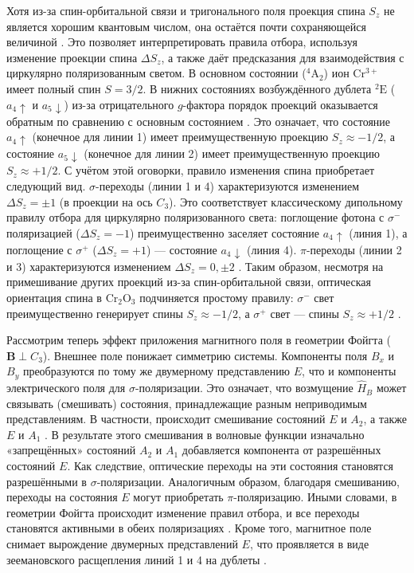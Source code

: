 \documentclass[14pt]{extarticle}
\newcommand{\crome}{\mathrm{Cr}_{2}\mathrm{O}_{3}}
\numberwithin{equation}{section}
\begin{document}
Хотя из-за спин-орбитальной связи и тригонального поля проекция спина $S_z$ не является хорошим квантовым числом, она остаётся почти сохраняющейся величиной \cite{Allen1969}. Это позволяет интерпретировать правила отбора, используя изменение проекции спина $\Delta S_z$, а также даёт предсказания для взаимодействия с циркулярно поляризованным светом. В основном состоянии ($^4\mathrm{A}_2$) ион Cr$^{3+}$ имеет полный спин $S=3/2$. В нижних состояниях возбуждённого дублета $^2\mathrm{E}$ ($a_4\uparrow$ и $a_5\downarrow$) из-за отрицательного $g$-фактора порядок проекций оказывается обратным по сравнению с основным состоянием \cite{Allen1969}. Это означает, что состояние $a_4\uparrow$ (конечное для линии 1) имеет преимущественную проекцию $S_z \approx -1/2$, а состояние $a_5\downarrow$ (конечное для линии 2) имеет преимущественную проекцию $S_z \approx +1/2$. С учётом этой оговорки, правило изменения спина приобретает следующий вид. $\sigma$-переходы (линии 1 и 4) характеризуются изменением $\Delta S_z = \pm 1$ (в проекции на ось $C_3$). Это соответствует классическому дипольному правилу отбора для циркулярно поляризованного света: поглощение фотона с $\sigma^-$ поляризацией ($\Delta S_z = -1$) преимущественно заселяет состояние $a_4\uparrow$ (линия 1), а поглощение с $\sigma^+$ ($\Delta S_z = +1$) — состояние $a_4\downarrow$ (линия 4). $\pi$-переходы (линии 2 и 3) характеризуются изменением $\Delta S_z = 0, \pm 2$ \cite{Allen1969, Pavlov}.  Таким образом, несмотря на примешивание других проекций из-за спин-орбитальной связи, оптическая ориентация спина в $\crome$ подчиняется простому правилу: $\sigma^-$ свет преимущественно генерирует спины $S_z \approx -1/2$, а $\sigma^+$ свет — спины $S_z \approx +1/2$ \cite{Allen1969}.

Рассмотрим теперь эффект приложения магнитного поля в геометрии Фойгта ($\mathbf{B} \perp C_3$). Внешнее поле понижает симметрию системы. Компоненты поля $B_x$ и $B_y$ преобразуются по тому же двумерному представлению $E$, что и компоненты электрического поля для $\sigma$-поляризации. Это означает, что возмущение $\hat{H}_B$ может связывать (смешивать) состояния, принадлежащие разным неприводимым представлениям. В частности, происходит смешивание состояний $E$ и $A_2$, а также $E$ и $A_1$ \cite{Allen1969}. В результате этого смешивания в волновые функции изначально «запрещённых» состояний $A_2$ и $A_1$ добавляется компонента от разрешённых состояний $E$. Как следствие, оптические переходы на эти состояния становятся разрешёнными в $\sigma$-поляризации. Аналогичным образом, благодаря смешиванию, переходы на состояния $E$ могут приобретать $\pi$-поляризацию. Иными словами, в геометрии Фойгта происходит изменение правил отбора, и все переходы становятся активными в обеих поляризациях \cite{Allen1969, Pavlov}. Кроме того, магнитное поле снимает вырождение двумерных представлений $E$, что проявляется в виде зеемановского расщепления линий 1 и 4 на дублеты \cite{Allen1969}. 
\end{document}
